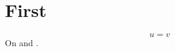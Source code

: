 \documentclass{article}
\begin{document}
\section{First}\label{sec:a}
\begin{equation}\label{eq:b} u = v \end{equation}
On  and .
\end{document}
